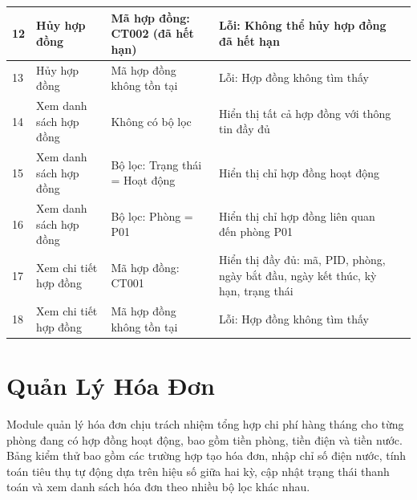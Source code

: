 \documentclass[12pt,a4paper]{article}
\begin{document}
\begin{table}[h!]
\begin{small}
\begin{tabularx}{\textwidth}{|p{0.8cm}|p{2.5cm}|p{3cm}|p{3cm}|p{2.5cm}|}
    12 & Hủy hợp đồng & Mã hợp đồng: CT002 (đã hết hạn) & Lỗi: Không thể hủy hợp đồng đã hết hạn & \\ \hline

    13 & Hủy hợp đồng & Mã hợp đồng không tồn tại & Lỗi: Hợp đồng không tìm thấy & \\ \hline

    14 & Xem danh sách hợp đồng & Không có bộ lọc & Hiển thị tất cả hợp đồng với thông tin đầy đủ & \\ \hline

    15 & Xem danh sách hợp đồng & Bộ lọc: Trạng thái = Hoạt động & Hiển thị chỉ hợp đồng hoạt động & \\ \hline

    16 & Xem danh sách hợp đồng & Bộ lọc: Phòng = P01 & Hiển thị chỉ hợp đồng liên quan đến phòng P01 & \\ \hline

    17 & Xem chi tiết hợp đồng & Mã hợp đồng: CT001 & Hiển thị đầy đủ: mã, PID, phòng, ngày bắt đầu, ngày kết thúc, kỳ hạn, trạng thái & \\ \hline

    18 & Xem chi tiết hợp đồng & Mã hợp đồng không tồn tại & Lỗi: Hợp đồng không tìm thấy & \\ \hline

    \end{tabularx}
    \end{small}
\end{table}

\newpage

\section{Quản Lý Hóa Đơn}

Module quản lý hóa đơn chịu trách nhiệm tổng hợp chi phí hàng tháng cho từng phòng đang có hợp đồng hoạt động, bao gồm tiền phòng, tiền điện và tiền nước. Bảng kiểm thử bao gồm các trường hợp tạo hóa đơn, nhập chỉ số điện nước, tính toán tiêu thụ tự động dựa trên hiệu số giữa hai kỳ, cập nhật trạng thái thanh toán và xem danh sách hóa đơn theo nhiều bộ lọc khác nhau.
\end{document}
